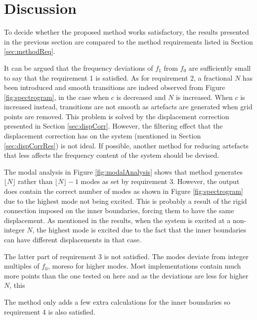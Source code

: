 \section{Discussion}
To decide whether the proposed method works satisfactory, the results presented in the previous section are compared to the method requirements listed in Section \eqref{sec:methodReq}. 

It can be argued that the frequency deviations of $f_1$ from $f_0$ are sufficiently small to say that the requirement 1 is satisfied. As for requirement 2, a fractional $N$ has been introduced and smooth transitions are indeed observed from Figure \ref{fig:spectrogram}, in the case when $c$ is decreased and $N$ is increased. When $c$ is increased instead, transitions are not smooth as artefacts are generated when grid points are removed. This problem is solved by the displacement correction presented in Section \ref{sec:dispCorr}. However, the filtering effect that the displacement correction has on the system (mentioned in Section \ref{sec:dispCorrRes}) is not ideal. If possible, another method for reducing artefacts that less affects the frequency content of the system should be devised. 

The modal analysis in Figure \ref{fig:modalAnalysis} shows that method generates $\lfloor N\rfloor$ rather than $\lfloor N\rfloor - 1$ modes as set by requirement 3. However, the output does contain the correct number of modes as shown in Figure \ref{fig:spectrogram} due to the highest mode not being excited. This is probably a result of the rigid connection imposed on the inner boundaries, forcing them to have the same displacement. As mentioned in the results, when the system is excited at a non-integer $N$, the highest mode is excited due to the fact that the inner boundaries can have different displacements in that case.

The latter part of requirement 3 is not satisfied. The modes deviate from integer multiples of $f_0$, moreso for higher modes. Most implementations contain much more points than the one tested on here and as the deviations are less for higher $N$, this 

The method only adds a few extra calculations for the inner boundaries so requirement 4 is also satisfied. 


